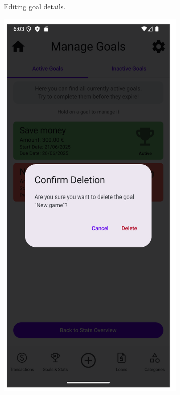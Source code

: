 \documentclass[a4paper,12pt]{article}
\begin{document}
\begin{figure}[H]
\begin{subfigure}[b]{0.23\textwidth}
        \caption{Editing goal details.}
        \label{fig:goal_edit_form}
    \end{subfigure}
    \hfill
    \begin{subfigure}[b]{0.23\textwidth}
        \includegraphics[width=\textwidth]{manage_goals_delete_dialog.png}

\end{subfigure}
\end{figure}
\end{document}
